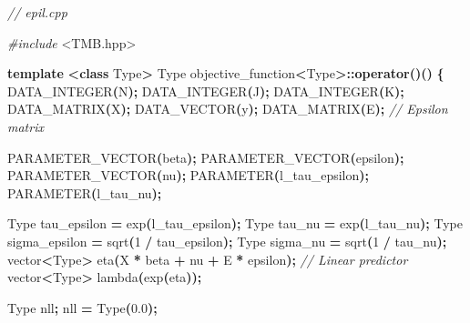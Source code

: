 \documentclass[a4paper, nobind]{templates/ociamthesis}
\newenvironment{Shaded}{\begin{snugshade}}{\end{snugshade}}
\newcommand{\CommentTok}[1]{\textcolor[rgb]{0.56,0.35,0.01}{\textit{#1}}}
\newcommand{\DecValTok}[1]{\textcolor[rgb]{0.00,0.00,0.81}{#1}}
\newcommand{\FloatTok}[1]{\textcolor[rgb]{0.00,0.00,0.81}{#1}}
\newcommand{\ImportTok}[1]{#1}
\newcommand{\KeywordTok}[1]{\textcolor[rgb]{0.13,0.29,0.53}{\textbf{#1}}}
\newcommand{\NormalTok}[1]{#1}
\newcommand{\OperatorTok}[1]{\textcolor[rgb]{0.81,0.36,0.00}{\textbf{#1}}}
\newcommand{\PreprocessorTok}[1]{\textcolor[rgb]{0.56,0.35,0.01}{\textit{#1}}}
\renewenvironment{Shaded}
{
  \vspace{10pt}%
  \begin{snugshade}%
}{%
  \end{snugshade}%
  \vspace{8pt}%
}
\begin{document}
\begin{Shaded}
\begin{Highlighting}[]
\CommentTok{// epil.cpp}

\PreprocessorTok{\#include }\ImportTok{\textless{}TMB.hpp\textgreater{}}

\KeywordTok{template} \OperatorTok{\textless{}}\KeywordTok{class}\NormalTok{ Type}\OperatorTok{\textgreater{}}
\NormalTok{Type objective\_function}\OperatorTok{\textless{}}\NormalTok{Type}\OperatorTok{\textgreater{}::}\KeywordTok{operator}\OperatorTok{()()}
\OperatorTok{\{}
\NormalTok{  DATA\_INTEGER}\OperatorTok{(}\NormalTok{N}\OperatorTok{);}
\NormalTok{  DATA\_INTEGER}\OperatorTok{(}\NormalTok{J}\OperatorTok{);}
\NormalTok{  DATA\_INTEGER}\OperatorTok{(}\NormalTok{K}\OperatorTok{);}
\NormalTok{  DATA\_MATRIX}\OperatorTok{(}\NormalTok{X}\OperatorTok{);}
\NormalTok{  DATA\_VECTOR}\OperatorTok{(}\NormalTok{y}\OperatorTok{);}
\NormalTok{  DATA\_MATRIX}\OperatorTok{(}\NormalTok{E}\OperatorTok{);} \CommentTok{// Epsilon matrix}
  
\NormalTok{  PARAMETER\_VECTOR}\OperatorTok{(}\NormalTok{beta}\OperatorTok{);}
\NormalTok{  PARAMETER\_VECTOR}\OperatorTok{(}\NormalTok{epsilon}\OperatorTok{);}
\NormalTok{  PARAMETER\_VECTOR}\OperatorTok{(}\NormalTok{nu}\OperatorTok{);}
\NormalTok{  PARAMETER}\OperatorTok{(}\NormalTok{l\_tau\_epsilon}\OperatorTok{);}
\NormalTok{  PARAMETER}\OperatorTok{(}\NormalTok{l\_tau\_nu}\OperatorTok{);}
  
\NormalTok{  Type tau\_epsilon }\OperatorTok{=}\NormalTok{ exp}\OperatorTok{(}\NormalTok{l\_tau\_epsilon}\OperatorTok{);}
\NormalTok{  Type tau\_nu }\OperatorTok{=}\NormalTok{ exp}\OperatorTok{(}\NormalTok{l\_tau\_nu}\OperatorTok{);}
\NormalTok{  Type sigma\_epsilon }\OperatorTok{=}\NormalTok{ sqrt}\OperatorTok{(}\DecValTok{1} \OperatorTok{/}\NormalTok{ tau\_epsilon}\OperatorTok{);}
\NormalTok{  Type sigma\_nu }\OperatorTok{=}\NormalTok{ sqrt}\OperatorTok{(}\DecValTok{1} \OperatorTok{/}\NormalTok{ tau\_nu}\OperatorTok{);}
\NormalTok{  vector}\OperatorTok{\textless{}}\NormalTok{Type}\OperatorTok{\textgreater{}}\NormalTok{ eta}\OperatorTok{(}\NormalTok{X }\OperatorTok{*}\NormalTok{ beta }\OperatorTok{+}\NormalTok{ nu }\OperatorTok{+}\NormalTok{ E }\OperatorTok{*}\NormalTok{ epsilon}\OperatorTok{);} \CommentTok{// Linear predictor}
\NormalTok{  vector}\OperatorTok{\textless{}}\NormalTok{Type}\OperatorTok{\textgreater{}}\NormalTok{ lambda}\OperatorTok{(}\NormalTok{exp}\OperatorTok{(}\NormalTok{eta}\OperatorTok{));}
  
\NormalTok{  Type nll}\OperatorTok{;}
\NormalTok{  nll }\OperatorTok{=}\NormalTok{ Type}\OperatorTok{(}\FloatTok{0.0}\OperatorTok{);}
  

\end{Highlighting}
\end{Shaded}
\end{document}
